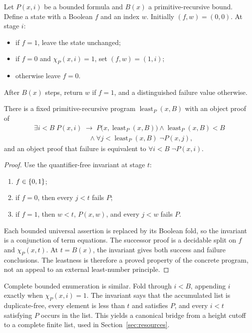 Let \(P(x,i)\) be a bounded formula and \(B(x)\) a primitive-recursive bound.  Define a state with a
Boolean \(f\) and an index \(w\).  Initially \((f,w)=(0,0)\).  At stage \(i\):
\begin{itemize}
  \item if \(f=1\), leave the state unchanged;
  \item if \(f=0\) and \(\chi_P(x,i)=1\), set \((f,w)=(1,i)\);
  \item otherwise leave \(f=0\).
\end{itemize}
After \(B(x)\) steps, return \(w\) if \(f=1\), and a distinguished failure value otherwise.

\begin{theorem}
\label{thm:least-search}
There is a fixed primitive-recursive program \(\operatorname{least}_P(x,B)\) with an object proof of
\[
\begin{split}
 &\exists i<B\;P(x,i)
 \;\to\;
 P\bigl(x,\operatorname{least}_P(x,B)\bigr)
 \wedge \operatorname{least}_P(x,B)<B\\
 &\hspace{8em}\wedge
 \forall j<\operatorname{least}_P(x,B)\;\neg P(x,j),
\end{split}
\]
and an object proof that failure is equivalent to \(\forall i<B\;\neg P(x,i)\).
\end{theorem}

\begin{proof}
Use the quantifier-free invariant at stage \(t\):
\begin{enumerate}
  \item \(f\in\{0,1\}\);
  \item if \(f=0\), then every \(j<t\) fails \(P\);
  \item if \(f=1\), then \(w<t\), \(P(x,w)\), and every \(j<w\) fails \(P\).
\end{enumerate}
Each bounded universal assertion is replaced by its Boolean fold, so the invariant is a conjunction of
term equations.  The successor proof is a decidable split on \(f\) and \(\chi_P(x,t)\).  At
\(t=B(x)\), the invariant gives both success and failure conclusions.  The leastness is therefore a proved
property of the concrete program, not an appeal to an external least-number principle.
\end{proof}

Complete bounded enumeration is similar.  Fold through \(i<B\), appending \(i\) exactly when
\(\chi_P(x,i)=1\).  The invariant says that the accumulated list is duplicate-free, every element is less
than \(t\) and satisfies \(P\), and every \(i<t\) satisfying \(P\) occurs in the list.  This yields a
canonical bridge from a height cutoff to a complete finite list, used in Section~\ref{sec:resources}.

